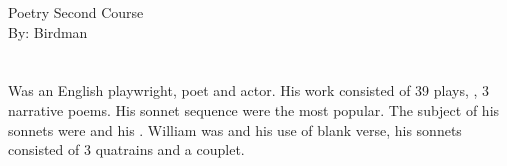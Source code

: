 \documentclass[12pt, a4paper]{article}
\begin{document}
\begin{center}
\huge{Poetry Second Course}\\[0.5cm]
\Large{By: Birdman}\\[1cm]
\end{center}

\section*{}
{\fontpar
Was an English playwright, poet and actor. His work consisted
of 39 plays, , 3 narrative poems. His sonnet sequence were
the most popular. The subject of his sonnets were  and his .
William was  and his use of blank verse, his 
sonnets consisted of 3 quatrains and a couplet.
}
\end{document}

